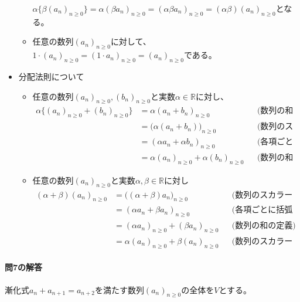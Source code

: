 \begin{itemize}
\begin{itemize}
$\alpha\bigl\{\beta(a_n)_{n \geq 0}\bigr\} = \alpha (\beta a_n)_{n \geq 0} = (\alpha \beta a_n)_{n \geq 0} = (\alpha \beta)(a_n)_{n \geq 0}$となる。
\item 任意の数列$(a_n)_{n \geq 0}$に対して、$1\cdot (a_n)_{n \geq 0} = (1\cdot a_n)_{n \geq 0} = (a_n)_{n \geq 0}$である。
\end{itemize}
\item 分配法則について
\begin{itemize}
\item 任意の数列$(a_n)_{n \geq 0}, (b_n)_{n \geq 0}$と実数$\alpha \in \mathbb{R}$に対し、
\begin{align*}
\alpha\bigl\{(a_n)_{n \geq 0} + (b_n)_{n \geq 0}\bigr\} 
&= \alpha (a_n+ b_n)_{n \geq 0} & & \text{(数列の和の定義)} \\
&= \bigl(\alpha(a_n + b_n)\bigr)_{n \geq 0} & & \text{(数列のスカラー倍の定義)} \\
&= (\alpha a_n + \alpha b_n)_{n \geq 0} & & \text{(各項ごとに括弧を展開)} \\
&= \alpha (a_n)_{n \geq 0} + \alpha (b_n)_{n \geq 0} & & \text{(数列の和の定義)}
\end{align*}
\item 任意の数列$(a_n)_{n \geq 0}$と実数$\alpha, \beta\in\mathbb{R}$に対し
\begin{align*}
(\alpha + \beta) (a_n)_{n \geq 0}
&= \bigl( (\alpha + \beta) a_n\bigr)_{n \geq 0} & & \text{(数列のスカラー倍の定義)} \\
&= (\alpha a_n + \beta a_n)_{n \geq 0} & & \text{(各項ごとに括弧を展開)} \\
&= (\alpha a_n)_{n \geq 0} + (\beta a_n)_{n \geq 0} & & \text{(数列の和の定義)} \\
&= \alpha (a_n)_{n \geq 0} + \beta (a_n)_{n \geq 0} & & \text{(数列のスカラー倍の定義)}
\end{align*}
\end{itemize}
\end{itemize}

\paragraph{問7の解答}
漸化式$a_n + a_{n+1} = a_{n+2}$を満たす数列$(a_n)_{n\geq 0}$の全体を$V$とする。


